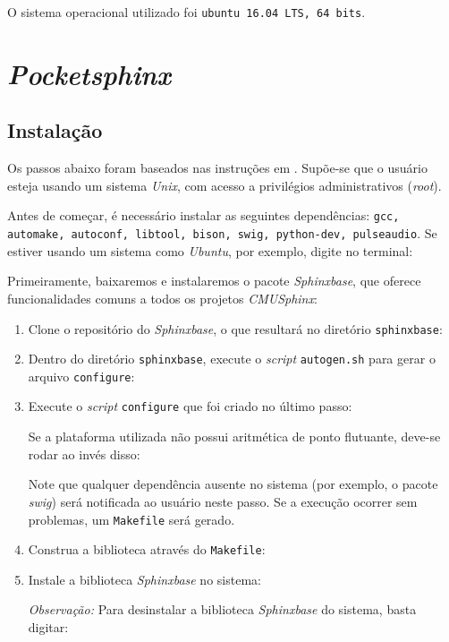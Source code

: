 O sistema operacional utilizado foi \texttt{ubuntu 16.04 LTS, 64 bits}.


\section{\emph{Pocketsphinx}}

\subsection{Instalação}

Os passos abaixo foram baseados nas instruções em \citep{pocketsphinxInstall}.
Supõe-se que o usuário esteja usando um sistema \emph{Unix}, com acesso a privilégios
administrativos (\emph{root}).

Antes de começar, é necessário instalar as seguintes dependências: \texttt{gcc,
automake, autoconf, libtool, bison, swig, python-dev, pulseaudio}. Se estiver usando
um sistema como \emph{Ubuntu}, por exemplo, digite no terminal:

Primeiramente, baixaremos e instalaremos o pacote \emph{Sphinxbase}, que oferece
funcionalidades comuns a todos os projetos \emph{CMUSphinx}:

\begin{enumerate}
\item Clone o repositório do \emph{Sphinxbase}, o que resultará no diretório
\texttt{sphinxbase}:

\item Dentro do diretório \texttt{sphinxbase}, execute o \emph{script}
\texttt{autogen.sh} para gerar o arquivo \texttt{configure}:

\item Execute o \emph{script} \texttt{configure} que foi criado no último passo:

Se a plataforma utilizada não possui aritmética de ponto flutuante, deve-se rodar ao
invés disso:

Note que qualquer dependência ausente no sistema (por exemplo, o pacote \emph{swig})
será notificada ao usuário neste passo. Se a execução ocorrer sem problemas, um
\texttt{Makefile} será gerado.

\item Construa a biblioteca através do \texttt{Makefile}:

\item Instale a biblioteca \emph{Sphinxbase} no sistema:

\emph{Observação:} Para desinstalar a biblioteca \emph{Sphinxbase} do sistema, basta digitar:
\end{enumerate}

